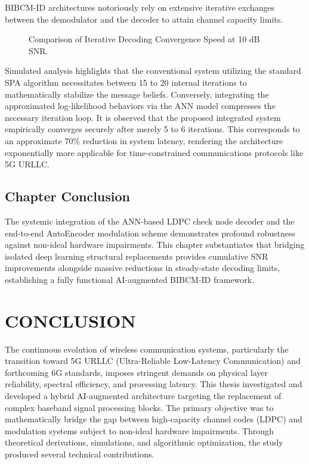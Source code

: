 \documentclass[a4paper,14pt]{extreport}
\begin{document}
BIBCM-ID architectures notoriously rely on extensive iterative exchanges between the demodulator and the decoder to attain channel capacity limits. 

\begin{figure}[H]
    \centering
    \caption{Comparison of Iterative Decoding Convergence Speed at 10 dB SNR.}
    \label{fig:ch5_convergence}
\end{figure}

Simulated analysis highlights that the conventional system utilizing the standard SPA algorithm necessitates between 15 to 20 internal iterations to mathematically stabilize the message beliefs. Conversely, integrating the approximated log-likelihood behaviors via the ANN model compresses the necessary iteration loop. It is observed that the proposed integrated system empirically converges securely after merely 5 to 6 iterations. This corresponds to an approximate $70\%$ reduction in system latency, rendering the architecture exponentially more applicable for time-constrained communications protocols like 5G URLLC.

\section{Chapter Conclusion}
The systemic integration of the ANN-based LDPC check node decoder and the end-to-end AutoEncoder modulation scheme demonstrates profound robustness against non-ideal hardware impairments. This chapter substantiates that bridging isolated deep learning structural replacements provides cumulative SNR improvements alongside massive reductions in steady-state decoding limits, establishing a fully functional AI-augmented BIBCM-ID framework.


\chapter*{CONCLUSION}

The continuous evolution of wireless communication systems, particularly the transition toward 5G URLLC (Ultra-Reliable Low-Latency Communication) and forthcoming 6G standards, imposes stringent demands on physical layer reliability, spectral efficiency, and processing latency. This thesis investigated and developed a hybrid AI-augmented architecture targeting the replacement of complex baseband signal processing blocks. The primary objective was to mathematically bridge the gap between high-capacity channel codes (LDPC) and modulation systems subject to non-ideal hardware impairments. Through theoretical derivations, simulations, and algorithmic optimization, the study produced several technical contributions.
\end{document}
